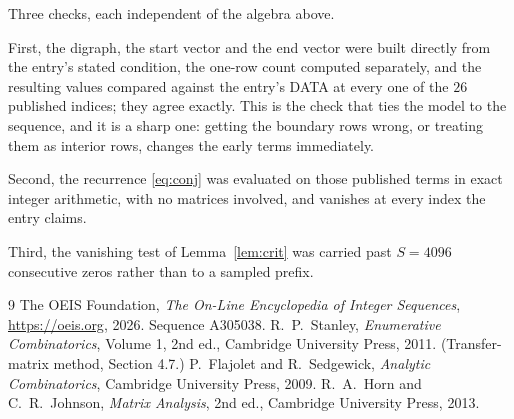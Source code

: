 \documentclass[11pt,a4paper]{article}
\theoremstyle{plain}
\theoremstyle{definition}
\begin{document}
Three checks, each independent of the algebra above.

First, the digraph, the start vector and the end vector were built directly from the
entry's stated condition, the one-row count computed separately, and the resulting values
compared against the entry's DATA at every one of the $26$ published indices; they
agree exactly. This is the check that ties the model to the sequence, and it is a sharp one:
getting the boundary rows wrong, or treating them as interior rows, changes the early terms
immediately.

Second, the recurrence \eqref{eq:conj} was evaluated on those published terms in exact
integer arithmetic, with no matrices involved, and vanishes at every index the entry claims.

Third, the vanishing test of Lemma~\ref{lem:crit} was carried past $S=4096$ consecutive
zeros rather than to a sampled prefix.

\begin{thebibliography}{9}
 The OEIS Foundation, \emph{The On-Line Encyclopedia of Integer
Sequences}, \url{https://oeis.org}, 2026. Sequence A305038.
 R.~P.~Stanley, \emph{Enumerative Combinatorics}, Volume 1, 2nd ed.,
Cambridge University Press, 2011. (Transfer-matrix method, Section 4.7.)
 P.~Flajolet and R.~Sedgewick, \emph{Analytic Combinatorics}, Cambridge
University Press, 2009.
 R.~A.~Horn and C.~R.~Johnson, \emph{Matrix Analysis}, 2nd ed., Cambridge
University Press, 2013.
\end{thebibliography}
\end{document}
